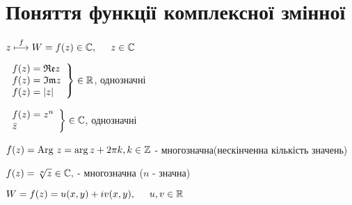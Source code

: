 \section{Поняття функції комплексної змінної}
$z\overset{f}{\longmapsto}W=f(z)\in\mathbb{C},\hspace*{0.5cm} z\in\mathbb{C}$
\begin{example}
	$\left.\begin{array}{l}
		f(z)=\mathfrak{Re} z\\f(z)=\mathfrak{Im} z\\f(z)=|z|
	\end{array}\right\}\in\mathbb{R}$, однозначні
\end{example}
\begin{example}
	$\left.\begin{array}{l}
		f(z)=z^n\\\bar{z}
	\end{array}\right\}\in\mathbb{C}$, однозначні
\end{example}
\begin{example}
	$f(z)=\textrm{Arg } z=\arg z+2\pi k,k\in\mathbb{Z}$ - многозначна(нескінченна кількість значень)
\end{example}
\begin{example}
	$f(z)=\sqrt[n]{z}\in\mathbb{C},$ - многозначна ($n$ - значна)
\end{example}
$W=f(z)=u(x,y)+iv(x,y),\hspace*{0.5cm} u,v\in\mathbb{R}$
